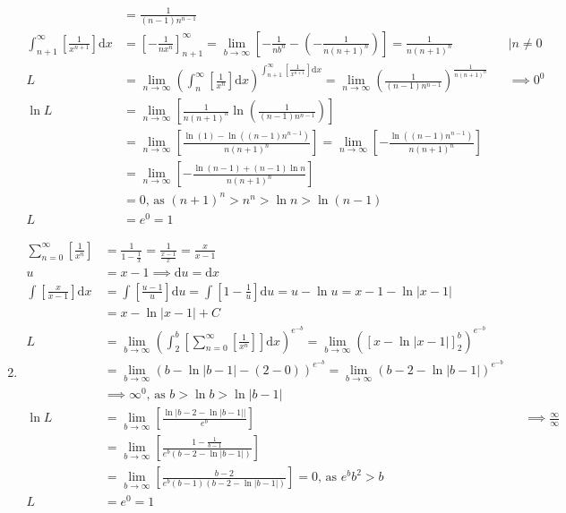 \documentclass[12pt, A4]{report}
\renewcommand{\d}{\text{d}}
\begin{document}
\begin{enumerate}
\begin{align*}
							&= \frac{1}{(n - 1)n^{n - 1}} \\
						\int_{n + 1}^{\infty}\left[\frac{1}{x^{n + 1}}\right]\d x &= \left[-\frac{1}{nx^n}\right]_{n + 1}^\infty
								= \lim_{b\to\infty}\left[-\frac{1}{nb^n} - \left(-\frac{1}{n(n + 1)^n}\right)\right]
								= \frac{1}{n(n + 1)^n}
								&&\mid n \ne 0 \\
						L &= \lim_{n\to\infty}\left(\int_n^{\infty}\left[\frac{1}{x^n}\right]\d x\right)^{\int_{n + 1}^\infty\left[\frac{1}{x^{n + 1}}\right]\d x} 
								= \lim_{n\to\infty}\left(\frac{1}{(n - 1)n^{n - 1}}\right)^{\frac{1}{n(n + 1)^n}}
								&&\implies 0^0 \\
						\ln L &= \lim_{n\to\infty}\left[\frac{1}{n(n + 1)^n}\ln\left(\frac{1}{(n - 1)n^{n - 1}}\right)\right] \\
							&= \lim_{n\to\infty}\left[\frac{\ln(1) - \ln((n - 1)n^{n - 1})}{n(n + 1)^n}\right] 
								= \lim_{n\to\infty}\left[-\frac{\ln((n - 1)n^{n - 1})}{n(n + 1)^n}\right] \\
							&= \lim_{n\to\infty}\left[-\frac{\ln(n - 1) + (n - 1)\ln n}{n(n + 1)^n}\right] \\
							&= 0 \text{, as $(n + 1)^n > n^n > \ln n > \ln(n - 1)$} \\
						L &= e^0 
								= 1
					\end{align*}
				\item
					\begin{align*}
						\sum_{n = 0}^{\infty}\left[\frac{1}{x^n}\right] &= \frac{1}{1 - \frac{1}{x}} 
								= \frac{1}{\frac{x - 1}{x}} 
								= \frac{x}{x - 1} \\
						u &= x - 1 \implies \d u = \d x \\
						\int\left[\frac{x}{x - 1}\right]\d x &= \int\left[\frac{u - 1}{u}\right]\d u 
								= \int\left[1 - \frac{1}{u}\right]\d u 
								= u - \ln u 
								= x - 1 - \ln|x - 1| \\
								&= x - \ln|x - 1| + C \\
						L &= \lim_{b\to\infty}\left(\int_2^b\left[\sum_{n = 0}^\infty\left[\frac{1}{x^n}\right]\right]\d x\right)^{e^{-b}}
								= \lim_{b\to\infty}\left(\left[x - \ln|x - 1|\right]_2^b\right)^{e^{-b}} \\
							&= \lim_{b\to\infty}\left(b - \ln|b - 1| - (2 - 0)\right)^{e^{-b}}
								= \lim_{b\to\infty}\left(b - 2 - \ln|b - 1|\right)^{e^{-b}} \\
						&\implies \infty^0 \text{, as $b > \ln b > \ln|b - 1|$} \\
						\ln L &= \lim_{b\to\infty}\left[\frac{\ln|b - 2 - \ln|b - 1||}{e^b}\right]
								&&\implies \frac{\infty}{\infty} \\
							&= \lim_{b\to\infty}\left[\frac{1 - \frac{1}{b - 1}}{e^b(b - 2 - \ln|b - 1|)}\right] \\
							&= \lim_{b\to\infty}\left[\frac{b - 2}{e^b(b - 1)(b - 2 - \ln|b - 1|)}\right]
								= 0 \text{, as $e^bb^2 > b$} \\
						L &= e^0 = 1
					\end{align*}
			\end{enumerate}
\end{document}
